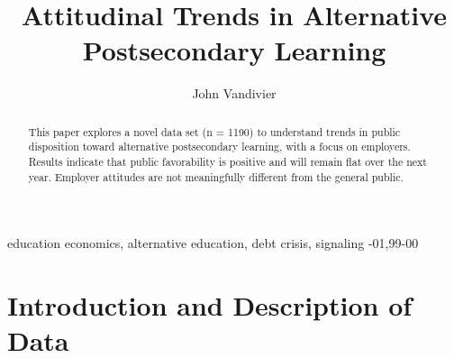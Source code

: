 \documentclass[review]{elsarticle}
\begin{document}
\begin{frontmatter}

\title{
    Attitudinal Trends in Alternative Postsecondary Learning
}

\author[mymainaddress]{John Vandivier} %
\address[mymainaddress]{4400 University Dr, Fairfax, VA 22030}




\begin{abstract}
    This paper explores a novel data set (n = 1190) to understand trends in public
    disposition toward alternative postsecondary learning, with a focus on employers.
    Results indicate that public favorability is positive and will remain flat over the next year.
    Employer attitudes are not meaningfully different from the general public.
\end{abstract}

\begin{keyword}
education economics, alternative education, debt crisis, signaling
-01\sep  99-00
\end{keyword}

\end{frontmatter}

\linenumbers
        
        \section{Introduction and Description of Data}
\end{document}
